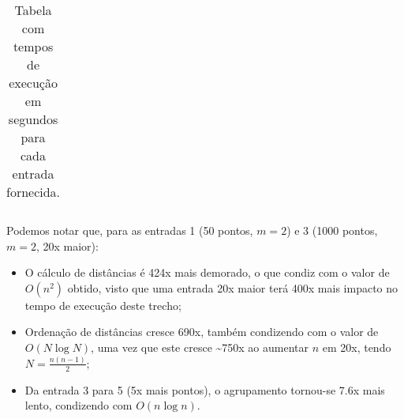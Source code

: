 \begin{table}[h]
\begin{tabular}{lccccccc}
\bottomrule
\end{tabular}
\caption{Tabela com tempos de execução em segundos para cada entrada fornecida.}
\label{tab-tempo-execucao}
\end{table}


Podemos notar que, para as entradas 1 (50 pontos, $m = 2$) e 3 (1000 pontos, $m = 2$, 20x maior):
\vspace{-1em}
\begin{itemize}
\setlength\itemsep{0em}

\item O cálculo de distâncias é 424x mais demorado, o que condiz com o valor de $O(n^2)$ obtido, visto que uma entrada 20x maior terá 400x mais impacto no tempo de execução deste trecho;
\item Ordenação de distâncias cresce 690x, também condizendo com o valor de $O(N \log{N})$, uma vez que este cresce \~{}750x ao aumentar $n$ em 20x, tendo $N = \frac{n(n-1)}{2}$;
\item Da entrada 3 para 5 (5x mais pontos), o agrupamento tornou-se 7.6x mais lento, condizendo com $O(n \log{n})$.

\end{itemize}